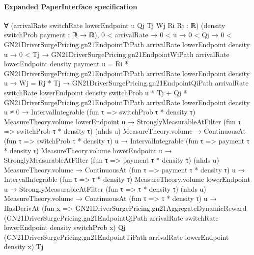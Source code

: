 \documentclass[10pt]{article}
\begin{document}
\paragraph{Expanded PaperInterface specification}
\begin{ReviewVerbatim}
∀ (arrivalRate switchRate lowerEndpoint u Qj Tj Wj Ri Rj : ℝ) (density switchProb payment : ℝ → ℝ),
  0 < arrivalRate →
    0 < u →
      0 < Qj →
        0 < GN21DriverSurgePricing.gn21EndpointTiPath arrivalRate lowerEndpoint density u →
          0 < Tj →
            GN21DriverSurgePricing.gn21EndpointWiPath arrivalRate lowerEndpoint density payment u =
                Ri * GN21DriverSurgePricing.gn21EndpointTiPath arrivalRate lowerEndpoint density u →
              Wj = Rj * Tj →
                GN21DriverSurgePricing.gn21EndpointQiPath arrivalRate switchRate lowerEndpoint density switchProb u *
                        Tj +
                      Qj * GN21DriverSurgePricing.gn21EndpointTiPath arrivalRate lowerEndpoint density u ≠
                    0 →
                  IntervalIntegrable (fun τ => switchProb τ * density τ) MeasureTheory.volume lowerEndpoint u →
                    StronglyMeasurableAtFilter (fun τ => switchProb τ * density τ) (nhds u) MeasureTheory.volume →
                      ContinuousAt (fun τ => switchProb τ * density τ) u →
                        IntervalIntegrable (fun τ => payment τ * density τ) MeasureTheory.volume lowerEndpoint u →
                          StronglyMeasurableAtFilter (fun τ => payment τ * density τ) (nhds u) MeasureTheory.volume →
                            ContinuousAt (fun τ => payment τ * density τ) u →
                              IntervalIntegrable (fun τ => τ * density τ) MeasureTheory.volume lowerEndpoint u →
                                StronglyMeasurableAtFilter (fun τ => τ * density τ) (nhds u) MeasureTheory.volume →
                                  ContinuousAt (fun τ => τ * density τ) u →
                                    HasDerivAt
                                        (fun x =>
                                          GN21DriverSurgePricing.gn21AggregateDynamicReward
                                            (GN21DriverSurgePricing.gn21EndpointQiPath arrivalRate switchRate
                                              lowerEndpoint density switchProb x)
                                            Qj
                                            (GN21DriverSurgePricing.gn21EndpointTiPath arrivalRate lowerEndpoint density
                                              x)
                                            Tj

\end{ReviewVerbatim}
\end{document}
